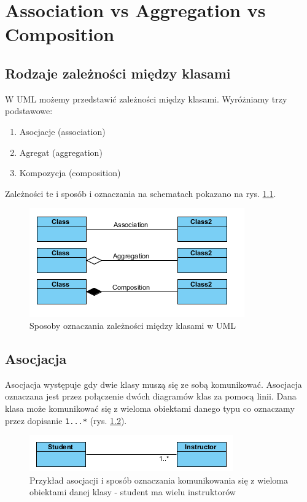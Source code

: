 \documentclass[a4paper,11pt]{report}
\begin{document}
\chapter{Association vs Aggregation vs Composition}
\section{Rodzaje zależności między klasami}
W UML możemy przedstawić zależności między klasami. Wyróżniamy trzy podstawowe:
\begin{enumerate}
	\item Asocjacje (association)
	\item Agregat (aggregation)
	\item Kompozycja (composition)
\end{enumerate}
Zależności te i sposób i oznaczania na schematach pokazano na rys.
\ref{fig:association}.
\begin{figure}[H]
	\centering
	\includegraphics{figures/association}
	\caption{Sposoby oznaczania zależności między klasami w UML \cite{association}}
	\label{fig:association}
\end{figure}


\section{Asocjacja}
Asocjacja występuje gdy dwie klasy muszą się ze sobą komunikować. Asocjacja oznaczana
jest przez połączenie dwóch diagramów klas za pomocą linii. Dana klasa może komunikować
się z wieloma obiektami danego typu co oznaczamy przez dopisanie \verb+1...*+ 
(rys. \ref{fig:oneToMany}).
\begin{figure}[H]
	\centering
	\includegraphics{figures/oneToMany}
	\caption{Przykład asocjacji i sposób oznaczania komunikowania się
	z wieloma obiektami danej klasy - student ma wielu instruktorów \cite{association}} 
	\label{fig:oneToMany}
\end{figure}
\end{document}
